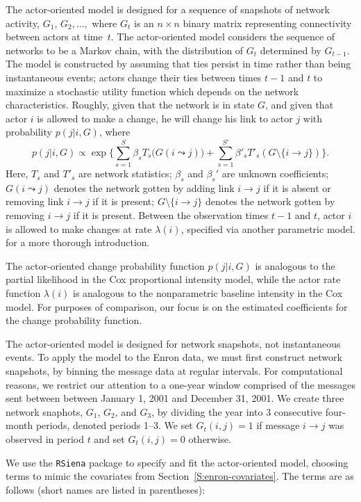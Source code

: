\documentclass[final]{statsoc}
\begin{document}
The actor-oriented model is designed for a sequence of snapshots of network
activity, $G_1$, $G_2,\dotsc,$ where $G_t$ is an $n \times n$ binary matrix
representing connectivity between actors at time~$t$.  The actor-oriented
model considers the sequence of networks to be a Markov chain, with the
distribution of $G_t$ determined by $G_{t-1}$.  The model is constructed by
assuming that ties persist in time rather than being instantaneous events;
actors change their ties between times $t-1$ and $t$ to maximize a stochastic
utility function which depends on the network characteristics.  Roughly, given
that the network is in state $G$, and given that actor $i$ is allowed to make
a change, he will change his link to actor $j$ with probability $p(j | i, G)$,
where
\[
  p(j | i, G) \propto
    \exp\Big\{ \sum_{s=1}^S \beta_s T_s\big(G(i \leadsto j)\big)
      +
        \sum_{s=1}^{S'} \beta'_s T'_s(G \setminus \{ i \to j\})
    \Big\}.
\]
Here, $T_s$ and $T'_s$ are network statistics;
$\beta_s$ and $\beta_s'$ are unknown coefficients;
$G(i \leadsto j)$ denotes the network gotten by adding link $i \to j$
if it is absent or removing link $i \to j$ if it is present;
$G \setminus \{ i \to j \}$ denotes the network gotten by removing $i \to j$
if it is present.  Between the observation times $t-1$ and $t$, actor
$i$ is allowed to make changes at rate $\lambda(i)$, specified via another
parametric model.  \citet{snijders2010introduction} for a more thorough
introduction.

The actor-oriented change probability function $p(j | i, G)$ is analogous to
the partial likelihood in the Cox proportional intensity model, while the
actor rate function $\lambda(i)$ is analogous to the nonparametric baseline
intensity in the Cox model.  For purposes of comparison, our focus is on the
estimated coefficients for the change probability function.

The actor-oriented model is designed for network snapshots, not instantaneous
events.  To apply the model to the Enron data, we must first construct network
snapshots, by binning the message data at regular intervals.  For
computational reasons, we restrict our attention to a one-year window
comprised of the messages sent between between January 1, 2001
and December 31, 2001.  We create three network
snaphots, $G_1$, $G_2$, and $G_3$, by dividing the year into $3$ consecutive
four-month periods, denoted periods 1--3.  We set $G_t(i,j) = 1$ if
message $i \to j$ was observed in period $t$ and set $G_t(i,j) = 0$ otherwise.

We use the \texttt{RSiena} package to specify and fit the actor-oriented model,
choosing terms to mimic the covariates from Section~\ref{S:enron-covariates}.
The terms are as follows (short names are listed in parentheses):
\end{document}
